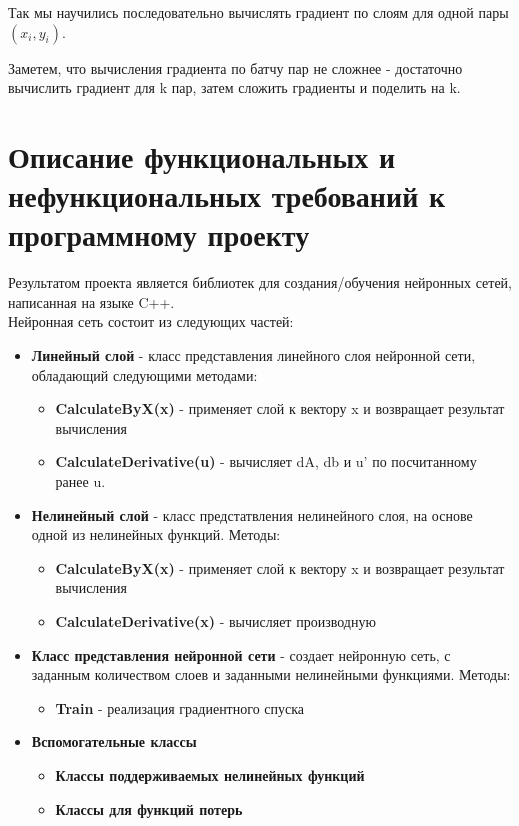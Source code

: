 \documentclass{article}
\begin{document}
Так мы научились последовательно вычислять градиент 
по слоям для одной пары $(x_i, y_i)$. 

Заметем, что вычисления градиента по батчу пар не сложнее - достаточно вычислить градиент для 
k пар, затем сложить градиенты и поделить на k.
\newpage
\section{Описание функциональных и нефункциональных требований к программному проекту}

Результатом проекта является библиотек для создания/обучения нейронных сетей, написанная 
на языке C++.\\
Нейронная сеть состоит из следующих частей:\\
\begin{itemize}
    \item  \textbf{Линейный слой} - 
    класс представления линейного слоя нейронной сети, обладающий следующими методами:
\begin{itemize}
    \item \textbf{CalculateByX(x)} - применяет слой к вектору x и возвращает результат вычисления
    \item \textbf{CalculateDerivative(u)} - вычисляет dA, db и u' по посчитанному ранее u.
\end{itemize}
    \item  \textbf{Нелинейный слой} - 
    класс предстатвления нелинейного слоя, на основе одной из нелинейных функций. Методы:
\begin{itemize}
    \item \textbf{CalculateByX(x)} - применяет слой к вектору x и возвращает результат вычисления
    \item \textbf{CalculateDerivative(x)} - вычисляет производную
\end{itemize}
    \item  \textbf{Класс представления нейронной сети} - создает нейронную сеть, с заданным количеством слоев 
    и заданными нелинейными функциями. Методы:
    \begin{itemize}
        \item \textbf{Train} - реализация градиентного спуска
    \end{itemize} 
    \item  \textbf{Вспомогательные классы}
\begin{itemize} 
    \item \textbf{Классы поддерживаемых нелинейных функций} 
    \item \textbf{Классы для функций потерь}
\end{itemize}
\end{itemize}
\end{document}
